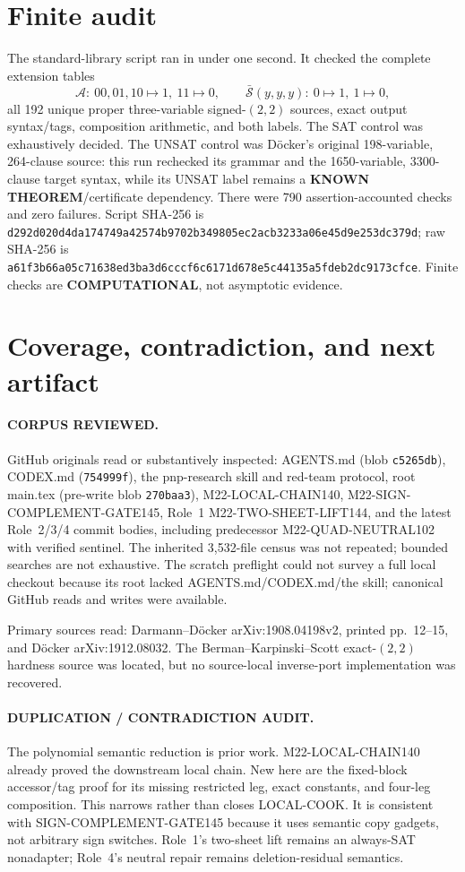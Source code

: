 \documentclass[11pt]{article}
\newcommand{\KNOWN}{\textbf{KNOWN THEOREM}}
\newcommand{\COMP}{\textbf{COMPUTATIONAL}}
\begin{document}
\section{Finite audit}
The standard-library script
ran in under one second.  It checked the complete extension tables
\[
\mathcal A:\ 00,01,10\mapsto1,\ 11\mapsto0,\qquad
\bar{\mathcal S}(y,y,y):\ 0\mapsto1,\ 1\mapsto0,
\]
all 192 unique proper three-variable signed-$(2,2)$ sources, exact output
syntax/tags, composition arithmetic, and both labels.  The SAT control was
exhaustively decided.  The UNSAT control was D\"ocker's original
198-variable, 264-clause source: this run rechecked its grammar and the
1650-variable, 3300-clause target syntax, while its UNSAT label remains a
\KNOWN/certificate dependency.  There were 790 assertion-accounted checks
and zero failures.  Script SHA-256 is
\nolinkurl{d292d020d4da174749a42574b9702b349805ec2acb3233a06e45d9e253dc379d};
raw SHA-256 is
\nolinkurl{a61f3b66a05c71638ed3ba3d6cccf6c6171d678e5c44135a5fdeb2dc9173cfce}.
Finite checks are \COMP, not asymptotic evidence.

\section{Coverage, contradiction, and next artifact}
\paragraph{CORPUS REVIEWED.}
GitHub originals read or substantively inspected: AGENTS.md
(blob \texttt{c5265db}), CODEX.md (\texttt{754999f}), the pnp-research skill
and red-team protocol, root main.tex (pre-write blob \texttt{270baa3}),
M22-LOCAL-CHAIN140, M22-SIGN-COMPLEMENT-GATE145, Role~1
M22-TWO-SHEET-LIFT144, and the latest Role~2/3/4 commit bodies, including
predecessor M22-QUAD-NEUTRAL102 with verified sentinel.  The inherited
3,532-file census was not repeated; bounded searches are not exhaustive.
The scratch preflight could not survey a full local checkout because its
root lacked AGENTS.md/CODEX.md/the skill; canonical GitHub reads and writes
were available.

Primary sources read: Darmann--D\"ocker arXiv:1908.04198v2, printed
pp.~12--15, and D\"ocker arXiv:1912.08032.  The Berman--Karpinski--Scott
exact-$(2,2)$ hardness source was located, but no source-local inverse-port
implementation was recovered.

\paragraph{DUPLICATION / CONTRADICTION AUDIT.}
The polynomial semantic reduction is prior work.  M22-LOCAL-CHAIN140 already
proved the downstream local chain.  New here are the fixed-block
accessor/tag proof for its missing restricted leg, exact constants, and
four-leg composition.  This narrows rather than closes LOCAL-COOK.  It is
consistent with SIGN-COMPLEMENT-GATE145 because it uses semantic copy
gadgets, not arbitrary sign switches.  Role~1's two-sheet lift remains an
always-SAT nonadapter; Role~4's neutral repair remains deletion-residual
semantics.
\end{document}
